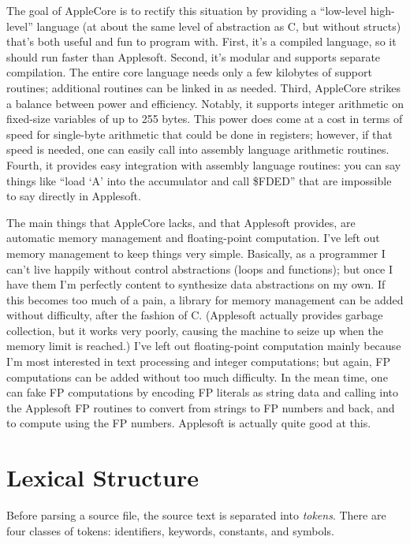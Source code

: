\documentclass[10pt]{article}
\begin{document}
The goal of AppleCore is to rectify this situation by providing a
``low-level high-level'' language (at about the same level of
abstraction as C, but without structs) that's both useful and fun to
program with.  First, it's a compiled language, so it should run
faster than Applesoft.  Second, it's modular and supports separate
compilation. The entire core language needs only a few kilobytes of
support routines; additional routines can be linked in as needed.
Third, AppleCore strikes a balance between power and efficiency.
Notably, it supports integer arithmetic on fixed-size variables of up
to 255 bytes.  This power does come at a cost in terms of speed for
single-byte arithmetic that could be done in registers; however, if
that speed is needed, one can easily call into assembly language
arithmetic routines.  Fourth, it provides easy integration with
assembly language routines: you can say things like ``load `A' into
the accumulator and call \$FDED'' that are impossible to say directly
in Applesoft.

The main things that AppleCore lacks, and that Applesoft provides, are
automatic memory management and floating-point computation.  I've left
out memory management to keep things very simple.  Basically, as a
programmer I can't live happily without control abstractions (loops
and functions); but once I have them I'm perfectly content to
synthesize data abstractions on my own.  If this becomes too much of a
pain, a library for memory management can be added without difficulty,
after the fashion of C.  (Applesoft actually provides garbage
collection, but it works very poorly, causing the machine to seize up
when the memory limit is reached.)  I've left out floating-point
computation mainly because I'm most interested in text processing and
integer computations; but again, FP computations can be added without
too much difficulty.  In the mean time, one can fake FP computations
by encoding FP literals as string data and calling into the Applesoft
FP routines to convert from strings to FP numbers and back, and to
compute using the FP numbers.  Applesoft is actually quite good at
this.

\section{Lexical Structure}

Before parsing a source file, the source text is separated into
\emph{tokens}.  There are four classes of tokens: identifiers,
keywords, constants, and symbols.
\end{document}
